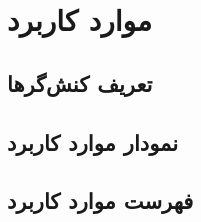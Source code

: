 
\chapter{موارد کاربرد}


\section{تعریف کنش‌گر‌ها}


\section{نمودار موارد کاربرد}


\section{فهرست موارد کاربرد}


